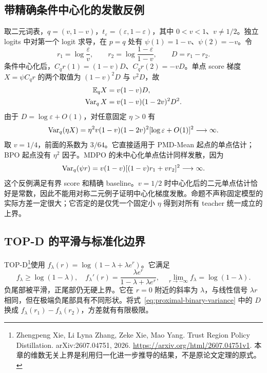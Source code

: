 \subsection{带精确条件中心化的发散反例}

取二元词表，$q=(v,1-v)$，$t_\varepsilon=(\varepsilon,1-\varepsilon)$，其中 $0<v<1$、$v\ne1/2$。独立 logits 中对第一个 logit 求导，在 $p=q$ 处有 $\psi(1)=1-v$、$\psi(2)=-v$。令
\begin{equation}
 r_1=\log\frac\varepsilon v,\qquad r_2=\log\frac{1-\varepsilon}{1-v},\qquad D=r_1-r_2.
\end{equation}
条件中心化后，$C_qr(1)=(1-v)D$、$C_qr(2)=-vD$。单点 score 梯度 $X=\psi C_qr$ 的两个取值为 $(1-v)^2D$ 与 $v^2D$，故
\begin{align}
 \mathbb E_qX&=v(1-v)D,\\
 \operatorname{Var}_qX&=v(1-v)(1-2v)^2D^2.
 \label{eq:proximal-binary-variance}
\end{align}
由于 $D=\log\varepsilon+O(1)$，对任意固定 $\eta>0$ 有
\begin{equation}
 \operatorname{Var}_q(\eta X)=\eta^2v(1-v)(1-2v)^2[\log\varepsilon+O(1)]^2\longrightarrow\infty.
\end{equation}
取 $v=1/4$，前面的系数为 $3/64$。它直接适用于 PMD-Mean 起点的单点估计；BPO 起点没有 $\eta^2$ 因子。MDPO 的未中心化单点估计同样发散，因为
\begin{equation}
 \operatorname{Var}_q(\psi r)=v(1-v)[(1-v)r_1+vr_2]^2\longrightarrow\infty.
\end{equation}
这个反例满足有界 score 和精确 baseline。$v=1/2$ 时中心化后的二元单点估计恰好是常数，因此不能用对称二元例子证明中心化梯度发散。命题不声称固定模型的实际方差一定很大；它否定的是仅凭一个固定小 $\eta$ 得到对所有 teacher 统一成立的上界。

\subsection{TOP-D 的平滑与标准化边界}

TOP-D\footnote{Zhengpeng Xie, Li Lyna Zhang, Zeke Xie, Mao Yang. Trust Region Policy Distillation. arXiv:2607.04751, 2026. \url{https://arxiv.org/html/2607.04751v1}. 本章的维数无关上界是利用归一化进一步推导的结果，不是原论文定理的原式。}使用 $f_\lambda(r)=\log(1-\lambda+\lambda e^r)$。它满足
\begin{equation}
 f_\lambda\ge\log(1-\lambda),\quad
 f_\lambda'(r)=\frac{\lambda e^r}{1-\lambda+\lambda e^r},\quad
 \lim_{r\to-\infty}f_\lambda=\log(1-\lambda).
\end{equation}
负尾部被平滑，正尾部仍无硬上界。它在 $r=0$ 附近的斜率为 $\lambda$，与线性信号 $\lambda r$ 相同，但在极端负尾部具有不同形状。将式~\eqref{eq:proximal-binary-variance} 中的 $D$ 换成 $f_\lambda(r_1)-f_\lambda(r_2)$，方差就有有限极限。

